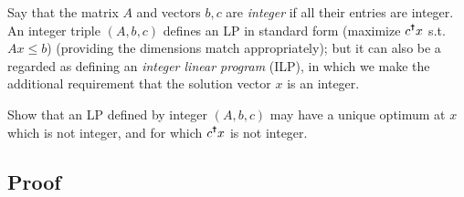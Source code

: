 \documentclass{article}
\begin{document}
Say that the matrix \(A\) and vectors \(b, c\) are \textit{integer} if all their entries
are integer. An integer triple \((A, b, c)\) defines an LP in standard form (maximize
\(c^{\text{\Cross{}}} x \) s.t. \(Ax \leq b\)) (providing the dimensions match appropriately); but
it can also be a regarded as defining an \textit{integer linear program} (ILP), in which
we make the additional requirement that the solution vector \(x\) is an integer. 

Show that an LP defined by integer \((A, b, c)\) may have a unique optimum at \(x\) which
is not integer, and for which \(c^{\text{\Cross{}}} x\) is not integer. 

\subsection{Proof}
\end{document}
